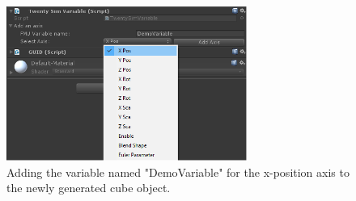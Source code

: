 \begin{figure}[ht]
	\centerline{\includegraphics[width=0.7\textwidth]{figures/20sim_Unity6.png}}
	\caption{Adding the variable named "DemoVariable" for the x-position axis to the newly generated cube object.}
	\label{figure:20-sim_unity_modify_variable}
\end{figure}

